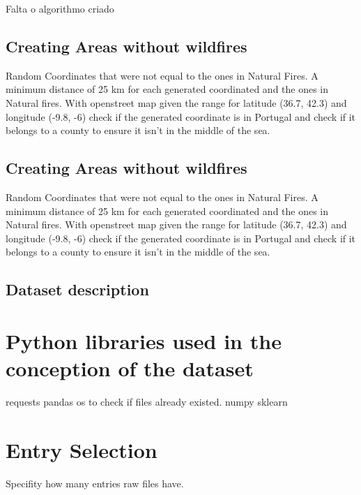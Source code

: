 Falta o algorithmo criado




\subsection{Creating Areas without wildfires}

Random Coordinates that were not equal to the ones in Natural Fires. A minimum distance of 25 km for each generated coordinated and the ones in Natural fires. With openstreet map given the range for latitude (36.7, 42.3) and longitude (-9.8, -6) check if the generated coordinate is in Portugal and check if it belongs to a county to ensure it isn't in the middle of the sea.








\subsection{Creating Areas without wildfires}

Random Coordinates that were not equal to the ones in Natural Fires. A minimum distance of 25 km for each generated coordinated and the ones in Natural fires. With openstreet map given the range for latitude (36.7, 42.3) and longitude (-9.8, -6) check if the generated coordinate is in Portugal and check if it belongs to a county to ensure it isn't in the middle of the sea.

\subsection{Dataset description}







\section{Python libraries used in the conception of the dataset}
requests
pandas
os to check if files already existed.
numpy
sklearn



\section{Entry Selection}
Specifity how many entries raw files have.







